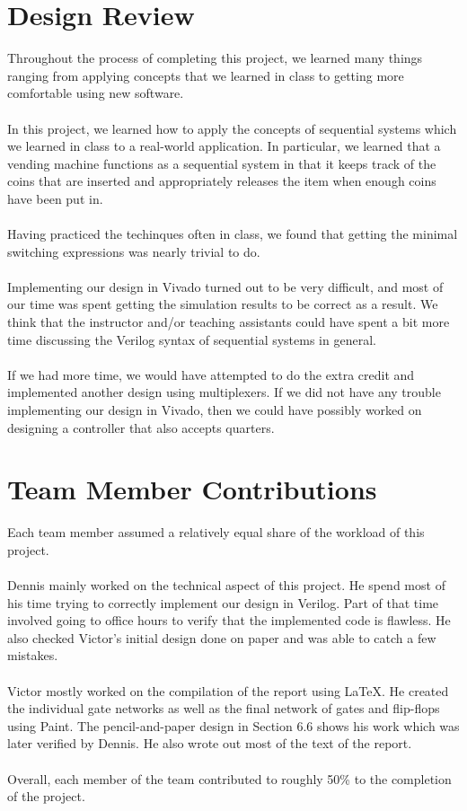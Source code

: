 \documentclass{article}
\begin{document}
\section{Design Review}
Throughout the process of completing this project, we learned many things 
ranging from applying concepts that we learned in class to getting more 
comfortable using new software.\\
\\
In this project, we learned how to apply the concepts of sequential systems 
which we learned in class to a real-world application. In particular, we 
learned that a vending machine functions as a sequential system in that it 
keeps track of the coins that are inserted and appropriately releases the item 
when enough coins have been put in.\\
\\
Having practiced the techinques often in class, we found that getting the 
minimal switching expressions was nearly trivial to do.\\
\\
Implementing our design in Vivado turned out to be very difficult, and most of 
our time was spent getting the simulation results to be correct as a result. 
We think that the instructor and/or teaching assistants could have spent a bit 
more time discussing the Verilog syntax of sequential systems in general.\\
\\
If we had more time, we would have attempted to do the extra credit and 
implemented another design using multiplexers. If we did not have any trouble 
implementing our design in Vivado, then we could have possibly worked on 
designing a controller that also accepts quarters.


\section{Team Member Contributions}
Each team member assumed a relatively equal share of the workload of this 
project.\\
\\
Dennis mainly worked on the technical aspect of this project. He spend most of 
his time trying to correctly implement our design in Verilog. Part of that time 
involved going to office hours to verify that the implemented code is flawless. 
He also checked Victor's initial design done on paper and was able to catch a 
few mistakes. \\
\\
Victor mostly worked on the compilation of the report using \LaTeX. He created 
the individual gate networks as well as the final network of gates and 
flip-flops using Paint. The pencil-and-paper design in Section 6.6 shows his 
work which was later verified by Dennis. He also wrote out most of the text of 
the report.\\
\\
Overall, each member of the team contributed to roughly 50\% to the completion 
of the project.
\end{document}

